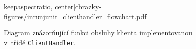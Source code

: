 \begin{figure}
keepaspectratio, center]{obrazky-figures/inrunjunit_clienthandler_flowchart.pdf}
	  \caption{Diagram znázorňující funkci obsluhy klienta implementovanou v~třídě \texttt{ClientHandler}.}
	  \label{fig:clientHandler_flowchart}
	\end{figure}
	
